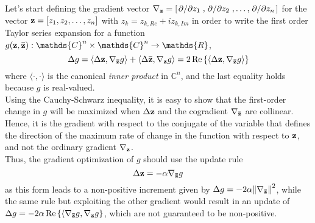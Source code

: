 \documentclass[../main.tex]{subfiles}
\begin{document}
Let's start defining the gradient vector $\nabla_{\vb{z}} = \left[\pdv*{z_1}, \pdv*{z_2},\dots,\pdv*{z_n}\right]$ for the vector $\vb{z}=\left[z_1, z_2, \dots, z_n\right]$ with $z_k = z_{k,Re} + iz_{k,Im}$ in order to write the first order Taylor series expansion for a function $g(\vb{z}, \vb{\bar{z}}):\mathds{C}^n\times\mathds{C}^n\to\mathds{R}$,
\[ \Delta g = \langle \Delta \vb{z}, \nabla_{\vb{\bar{z}}}g \rangle + \langle \Delta \vb{\bar{z}}, \nabla_{\vb{z}}g \rangle = 2\Re\left\{\langle \Delta \vb{z}, \nabla_{\vb{\bar{z}}}g \rangle\right\} \]
where $\langle\cdot,\cdot\rangle$ is the canonical \textit{inner product} in $\mathds{C}^n$, and the last equality holds because $g$ is real-valued.\\
Using the Cauchy-Schwarz inequality, it is easy to show that the first-order change in $g$ will be maximized when $\Delta\vb{z}$ and the cogradient $\nabla_{\vb{\bar{z}}}$ are collinear. Hence, it is the gradient with respect to the conjugate of the variable that defines the direction of the maximum rate of change in the function with respect to $\vb{z}$, and not the ordinary gradient $\nabla_{\vb{z}}$.\\
Thus, the gradient optimization of $g$ should use the update rule
\[ \Delta \vb{z} = -\alpha\nabla_{\vb{\bar{z}}}g \]
as this form leads to a non-positive increment given by $\Delta g = -2\alpha\norm{\nabla_{\vb{\bar{z}}}}^2$, while the same rule but exploiting the other gradient would result in an update of $\Delta g = -2\alpha\Re\left\{\langle\nabla_{\vb{\bar{z}}}g, \nabla_{\vb{z}}g\right\}$, which are not guaranteed to be non-positive.






	
\end{document}

